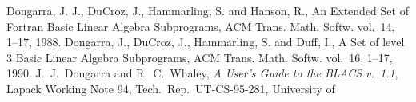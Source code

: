 \documentclass[10pt,a4paper,twoside]{article}
\begin{document}
\begin{thebibliography}{99}
 Dongarra, J. J.,  DuCroz, J.,  Hammarling, S. and Hanson, R.,
An Extended Set of {F}ortran {B}asic {L}inear {A}lgebra {S}ubprograms,
{ACM Trans. Math. Softw.} vol.~{14}, 1--17, 1988.
  Dongarra, J., DuCroz, J., Hammarling, S. and Duff, I.,
A  Set of level 3 Basic Linear Algebra Subprograms,
{ACM Trans. Math. Softw.} vol.~{16}, 1--17, 1990.
%
%
%
%
%
%
%
J.~J.~Dongarra and R.~C.~Whaley,
{\em A User's Guide to the BLACS v.~1.1},
Lapack Working Note 94, Tech.\ Rep.\ UT-CS-95-281, University of

\end{thebibliography}
\end{document}
